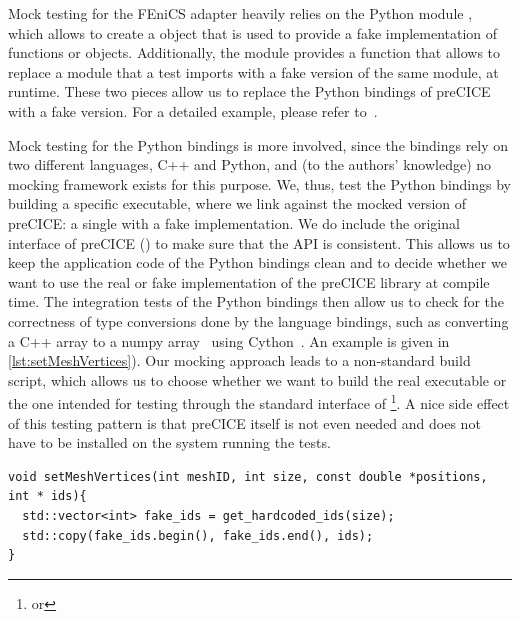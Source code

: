 Mock testing for the FEniCS adapter heavily relies on the Python module , which allows to create a  object that is used to provide a fake implementation of functions or objects. Additionally, the module provides a  function that allows to replace a module that a test imports with a fake version of the same module, at runtime. These two pieces allow us to replace the Python bindings of preCICE with a fake version. For a detailed example, please refer to~\cite{rodenberg2021fenicsprecice}.

Mock testing for the Python bindings is more involved, since the bindings rely on two different languages, C++ and Python, and (to the authors' knowledge) no mocking framework exists for this purpose. We, thus, test the Python bindings by building a specific executable, where we link against the mocked version of preCICE: a single  with a fake implementation. We do include the original interface of preCICE () to make sure that the API is consistent. This allows us to keep the application code of the Python bindings clean and to decide whether we want to use the real or fake implementation of the preCICE library at compile time.
The integration tests of the Python bindings then allow us to check for the correctness of type conversions done by the language bindings, such as converting a C++  array to a numpy array~\cite{NumPy} using Cython~\cite{behnel2011cython}. An example is given in \autoref{lst:setMeshVertices}).
Our mocking approach leads to a non-standard  build script, which allows us to choose whether we want to build the real executable or the one intended for testing through the standard interface of \footnote{ or }. A nice side effect of this testing pattern is that preCICE itself is not even needed and does not have to be installed on the system running the tests.

\begin{listing}[h!]
\begin{verbatim}
void setMeshVertices(int meshID, int size, const double *positions, int * ids){
  std::vector<int> fake_ids = get_hardcoded_ids(size);
  std::copy(fake_ids.begin(), fake_ids.end(), ids);
}
\end{verbatim}
\caption{Fake implementation of  used for integration tests of Python bindings. The fake version of  just returns fake vertex IDs. If an integration test of the Python bindings is calling this function, one can easily check whether the obtained vertex IDs are the expected ones using Python's unit testing framework.}
\label{lst:setMeshVertices}
\end{listing}


